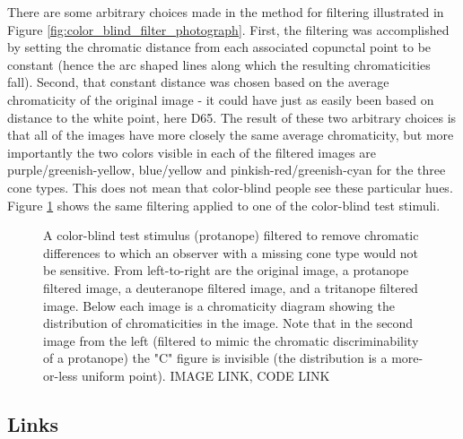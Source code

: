 \documentclass{article}
\newif\ifinvert
\begin{document}
There are some arbitrary choices made in the method for filtering illustrated in Figure \ref{fig:color_blind_filter_photograph}.  First, the filtering was accomplished by setting the chromatic distance from each associated copunctal point to be constant (hence the arc shaped lines along which the resulting chromaticities fall).  Second, that constant distance was chosen based on the average chromaticity of the original image - it could have just as easily been based on distance to the white point, here D65.  The result of these two arbitrary choices is that all of the images have more closely the same average chromaticity, but more importantly the two colors visible in each of the filtered images are purple/greenish-yellow, blue/yellow and pinkish-red/greenish-cyan for the three cone types.  This does not mean that color-blind people see these particular hues.  Figure \ref{fig:color_blind_filter_stimulus} shows the same filtering applied to one of the color-blind test stimuli.

\begin{figure} %
    \ifinvert
        
    \else
        
    \fi
    \caption{A color-blind test stimulus (protanope) filtered to remove chromatic differences to which an observer with a missing cone type would not be sensitive.  From left-to-right are the original image, a protanope filtered image, a deuteranope filtered image, and a tritanope filtered image.  Below each image is a chromaticity diagram showing the distribution of chromaticities in the image.  Note that in the second image from the left (filtered to mimic the chromatic discriminability of a protanope) the "C" figure is invisible (the distribution is a more-or-less uniform point).  IMAGE LINK, CODE LINK}\label{fig:color_blind_filter_stimulus}
\end{figure}

\subsection{Links} %
\end{document}
